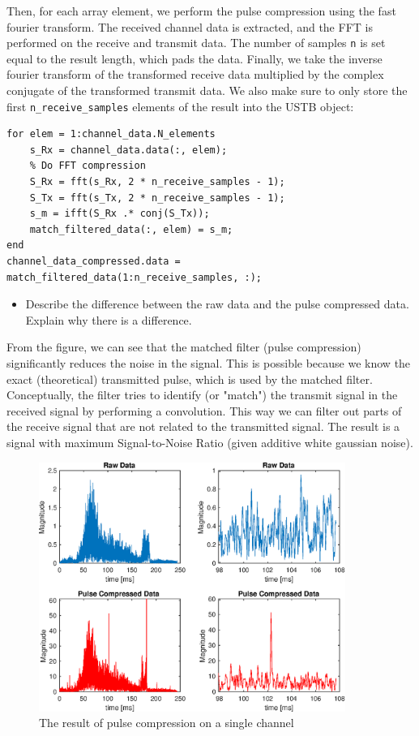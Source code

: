 \documentclass{article}
\begin{document}
\noindent Then, for each array element, we perform the pulse compression using the fast fourier transform.
The received channel data is extracted, and the FFT is performed on the receive and transmit data. The number of samples \verb|n| is 
set equal to the result length, which pads the data. Finally, we take the inverse fourier transform of the 
transformed receive data multiplied by the complex conjugate of the transformed transmit data. 
We also make sure to only store the first \verb|n_receive_samples| elements of the result into the USTB object:

\begin{lstlisting}[style=MatlabStyle]
for elem = 1:channel_data.N_elements
    s_Rx = channel_data.data(:, elem);
    % Do FFT compression
    S_Rx = fft(s_Rx, 2 * n_receive_samples - 1);
    S_Tx = fft(s_Tx, 2 * n_receive_samples - 1);
    s_m = ifft(S_Rx .* conj(S_Tx));
    match_filtered_data(:, elem) = s_m;
end
channel_data_compressed.data = match_filtered_data(1:n_receive_samples, :);
\end{lstlisting}


\begin{itemize}
    \item Describe the diﬀerence between the raw data and the pulse compressed data. Explain why there is a
    diﬀerence.
\end{itemize}

\noindent From the figure, we can see that the matched filter (pulse compression) significantly reduces the noise in the signal.
This is possible because we know the exact (theoretical) transmitted pulse, which is used by the matched filter. 
Conceptually, the filter tries to identify (or "match") the transmit signal in the received signal by performing a convolution.
This way we can filter out parts of the receive signal that are not related to the transmitted signal.
The result is a signal with maximum Signal-to-Noise Ratio (given additive white gaussian noise).

\begin{figure}[h]
    \includegraphics[width=10cm]{epsFig}
    \centering
    \caption{The result of pulse compression on a single channel}
\end{figure}
\end{document}
